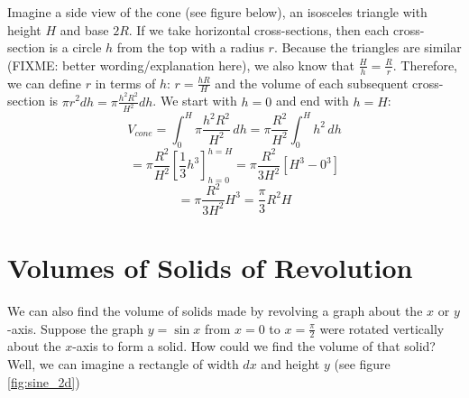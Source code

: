 \begin{Answer}[ref = volume3]
Imagine a side view of the cone (see figure below), an isosceles triangle with 
height $H$ and base $2R$. If we take horizontal cross-sections, then each 
cross-section is a circle $h$ from the top with a radius $r$. Because the 
triangles are similar (FIXME: better wording/explanation here), we also know 
that $\frac{H}{h} = \frac{R}{r}$. Therefore, we can define $r$ in terms of $h$:
$r = \frac{hR}{H}$ and the volume of each subsequent cross-section is $\pi r^2 
dh = \pi \frac{h^2 R^2}{H^2} dh$. We start with $h = 0$ and end with $h = H$:
$$V_{cone} = \int_0^H \pi \frac{h^2 R^2}{H^2}\,dh = \pi \frac{R^2}{H^2} \int_0^
H h^2\,dh$$
$$= \pi \frac{R^2}{H^2} \left[ \frac{1}{3}h^3 \right]_{h = 0}^{h = H} = \pi 
\frac{R^2}{3H^2} \left[H^3 - 0^3 \right]$$
$$= \pi \frac{R^2}{3H^2}H^3 = \frac{\pi}{3} R^2 H$$

\begin{center}
\end{center}
\vspace{50mm}
\end{Answer}

\section{Volumes of Solids of Revolution}
We can also find the volume of solids made by revolving a graph about the $x$ 
or $y$-axis. Suppose the graph $y = \sin{x}$ from $x = 0$ to $x = \frac{\pi}{2
}$ were rotated vertically about the $x$-axis to form a solid. How could we 
find the volume of that solid? Well, we can imagine a rectangle of width $dx$ 
and height $y$ (see figure \ref{fig:sine_2d})

